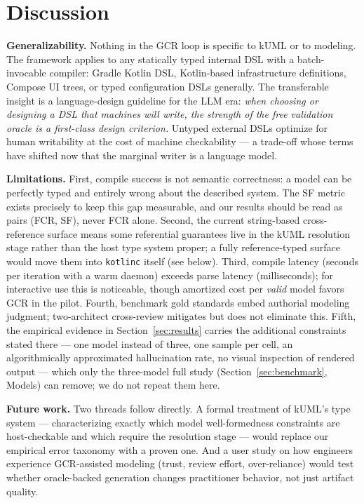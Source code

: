 \documentclass[acmsmall,nonacm]{acmart}
\begin{document}
\section{Discussion}
\label{sec:discussion}

\textbf{Generalizability.} Nothing in the GCR loop is specific to kUML or to modeling. The framework applies to any statically typed internal DSL with a batch-invocable compiler: Gradle Kotlin DSL, Kotlin-based infrastructure definitions, Compose UI trees, or typed configuration DSLs generally. The transferable insight is a language-design guideline for the LLM era: \emph{when choosing or designing a DSL that machines will write, the strength of the free validation oracle is a first-class design criterion.} Untyped external DSLs optimize for human writability at the cost of machine checkability --- a trade-off whose terms have shifted now that the marginal writer is a language model.

\textbf{Limitations.} First, compile success is not semantic correctness: a model can be perfectly typed and entirely wrong about the described system. The SF metric exists precisely to keep this gap measurable, and our results should be read as pairs (FCR, SF), never FCR alone. Second, the current string-based cross-reference surface means some referential guarantees live in the kUML resolution stage rather than the host type system proper; a fully reference-typed surface would move them into \texttt{kotlinc} itself (see below). Third, compile latency (seconds per iteration with a warm daemon) exceeds parse latency (milliseconds); for interactive use this is noticeable, though amortized cost per \emph{valid} model favors GCR in the pilot. Fourth, benchmark gold standards embed authorial modeling judgment; two-architect cross-review mitigates but does not eliminate this. Fifth, the empirical evidence in Section~\ref{sec:results} carries the additional constraints stated there --- one model instead of three, one sample per cell, an algorithmically approximated hallucination rate, no visual inspection of rendered output --- which only the three-model full study (Section~\ref{sec:benchmark}, Models) can remove; we do not repeat them here.

\textbf{Future work.} Two threads follow directly. A formal treatment of kUML's type system --- characterizing exactly which model well-formedness constraints are host-checkable and which require the resolution stage --- would replace our empirical error taxonomy with a proven one. And a user study on how engineers experience GCR-assisted modeling (trust, review effort, over-reliance) would test whether oracle-backed generation changes practitioner behavior, not just artifact quality.
\end{document}
